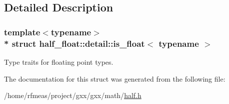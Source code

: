 \subsection{Detailed Description}
\subsubsection*{template$<$typename$>$\\*
struct half\+\_\+float\+::detail\+::is\+\_\+float$<$ typename $>$}

Type traits for floating point types. 

The documentation for this struct was generated from the following file\+:\begin{DoxyCompactItemize}
\item 
/home/rfmeas/project/gxx/gxx/math/\hyperlink{half_8h}{half.\+h}\end{DoxyCompactItemize}
